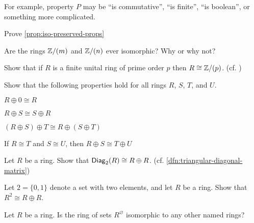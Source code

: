 For example, property \(P\) may be ``is commutative'', ``is finite'', ``is boolean'', or something more complicated.



\Exercises%

\begin{exercise}
Prove \autoref{prop:iso-preserved-props}
\end{exercise}

\begin{exercise}
Are the rings \(\mathbb{Z}/(m)\) and \(\mathbb{Z}/(n)\) ever isomorphic? Why or why not?
\end{exercise}

\begin{exercise}
Show that if \(R\) is a finite unital ring of prime order \(p\) then \(R \cong \mathbb{Z}/(p)\). (cf. )
\end{exercise}

\begin{exercise}
Show that the following properties hold for all rings \(R\), \(S\), \(T\), and \(U\). \label{exerc:direct-sum-basics}
\begin{proplist*}
\item \(R \oplus 0 \cong R\) \label{exerc:direct-sum-basics:zero}
\item \(R \oplus S \cong S \oplus R\) \label{exerc:direct-sum-basics:comm}
\item \((R \oplus S) \oplus T \cong R \oplus (S \oplus T)\) \label{exerc:direct-sum-basics:assoc}
\item If \(R \cong T\) and \(S \cong U\), then \(R \oplus S \cong T \oplus U\) \label{exerc:direct-sum-well-defined}
\end{proplist*}
\end{exercise}

\begin{exercise}
Let \(R\) be a ring. Show that \(\mathsf{Diag}_{2}(R) \cong R \oplus R\). (cf. \ref{dfn:triangular-diagonal-matrix})
\end{exercise}

\begin{exercise}
Let \(2 = \{ 0, 1 \}\) denote a set with two elements, and let \(R\) be a ring. Show that \(R^2 \cong R \oplus R\).
\end{exercise}

\begin{exercise}
Let \(R\) be a ring. Is the ring of sets \(R^\varnothing\) isomorphic to any other named rings?
\end{exercise}

